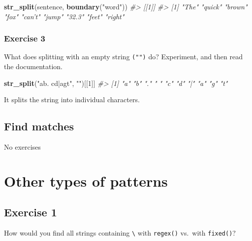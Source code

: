 \documentclass[]{book}
\newenvironment{Shaded}{\begin{snugshade}}{\end{snugshade}}
\newcommand{\CommentTok}[1]{\textcolor[rgb]{0.56,0.35,0.01}{\textit{#1}}}
\newcommand{\DecValTok}[1]{\textcolor[rgb]{0.00,0.00,0.81}{#1}}
\newcommand{\KeywordTok}[1]{\textcolor[rgb]{0.13,0.29,0.53}{\textbf{#1}}}
\newcommand{\NormalTok}[1]{#1}
\newcommand{\StringTok}[1]{\textcolor[rgb]{0.31,0.60,0.02}{#1}}
\theoremstyle{plain}
\theoremstyle{remark}
\theoremstyle{definition}
\theoremstyle{definition}
\theoremstyle{definition}
\theoremstyle{remark}
\begin{document}
\begin{Shaded}
\begin{Highlighting}[]
\KeywordTok{str_split}\NormalTok{(sentence, }\KeywordTok{boundary}\NormalTok{(}\StringTok{"word"}\NormalTok{))}
\CommentTok{#> [[1]]}
\CommentTok{#> [1] "The"   "quick" "brown" "fox"   "can’t" "jump"  "32.3"  "feet"  "right"}
\end{Highlighting}
\end{Shaded}

\hypertarget{exercise-3-32}{%
\subsubsection{Exercise 3}\label{exercise-3-32}}

What does splitting with an empty string \texttt{("")} do? Experiment,
and then read the documentation.

\begin{Shaded}
\begin{Highlighting}[]
\KeywordTok{str_split}\NormalTok{(}\StringTok{"ab. cd|agt"}\NormalTok{, }\StringTok{""}\NormalTok{)[[}\DecValTok{1}\NormalTok{]]}
\CommentTok{#>  [1] "a" "b" "." " " "c" "d" "|" "a" "g" "t"}
\end{Highlighting}
\end{Shaded}

It splits the string into individual characters.

\hypertarget{find-matches}{%
\subsection{Find matches}\label{find-matches}}

No exercises

\hypertarget{other-types-of-patterns}{%
\section{Other types of patterns}\label{other-types-of-patterns}}

\hypertarget{exercise-1-41}{%
\subsection{Exercise 1}\label{exercise-1-41}}

How would you find all strings containing \texttt{\textbackslash{}} with
\texttt{regex()} vs.~with \texttt{fixed()}?
\end{document}
